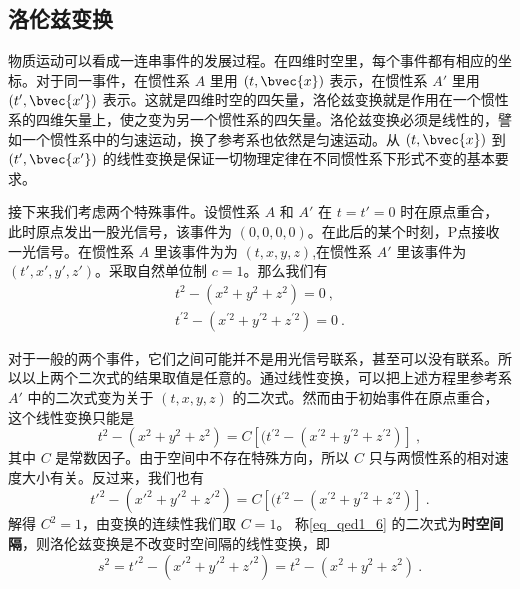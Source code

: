 

\subsection{洛伦兹变换}
物质运动可以看成一连串事件的发展过程。在四维时空里，每个事件都有相应的坐标。对于同一事件，在惯性系 $A$ 里用 $(t, \bvec{x})$ 表示，在惯性系 $A'$ 里用 $(t', \bvec{x'})$ 表示。这就是四维时空的四矢量，洛伦兹变换就是作用在一个惯性系的四维矢量上，使之变为另一个惯性系的四矢量。洛伦兹变换必须是线性的，譬如一个惯性系中的匀速运动，换了参考系也依然是匀速运动。从 $(t, \bvec{x})$ 到 $(t', \bvec{x'})$ 的线性变换是保证一切物理定律在不同惯性系下形式不变的基本要求。

接下来我们考虑两个特殊事件。设惯性系 $A$ 和 $A'$ 在 $t=t'=0$ 时在原点重合，此时原点发出一股光信号，该事件为 $(0,0,0,0)$。在此后的某个时刻，P点接收一光信号。在惯性系 $A$ 里该事件为为 $(t,x,y,z)$,在惯性系 $A'$ 里该事件为 $(t',x',y',z')$。采取自然单位制 $c=1$。那么我们有
\begin{equation}\label{eq_qed1_6}
\begin{array}{c}
t^{2}-(x^{2}+y^{2}+z^{2})=0~,\\
t^{\prime 2}-(x^{\prime 2}+y^{\prime 2}+z^{\prime 2})=0~.
\end{array}
\end{equation}

对于一般的两个事件，它们之间可能并不是用光信号联系，甚至可以没有联系。所以以上两个二次式的结果取值是任意的。通过线性变换，可以把上述方程里参考系 $A'$ 中的二次式变为关于 $(t,x,y,z)$ 的二次式。然而由于初始事件在原点重合，这个线性变换只能是
\begin{equation}
t^{2}-(x^{2}+y^{2}+z^{2})=C\left[(t^{\prime 2}-(x^{\prime 2}+y^{\prime 2}+z^{\prime 2})\right]~,
\end{equation}
其中 $C$ 是常数因子。由于空间中不存在特殊方向，所以 $C$ 只与两惯性系的相对速度大小有关。反过来，我们也有
\begin{equation}
t'^{2}-(x'^{2}+y'^{2}+z'^{2})=C\left[(t^{\prime 2}-(x^{\prime 2}+y^{\prime 2}+z^{\prime 2})\right]~.
\end{equation}
解得 $C^2=1$，由变换的连续性我们取 $C=1$。
称\autoref{eq_qed1_6} 的二次式为\textbf{时空间隔}，则洛伦兹变换是不改变时空间隔的线性变换，即
\begin{equation}\label{eq_qed1_7}
s^2=t'^{2}-(x'^{2}+y'^{2}+z'^{2})=t^{2}-(x^{2}+y^{2}+z^{2})~.
\end{equation}

